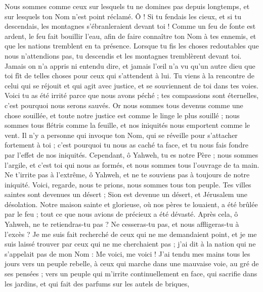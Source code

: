 \begin{multicols}{2}
Nous sommes comme ceux sur lesquels tu ne domines pas depuis longtemps, et sur lesquels ton Nom n'est point réclamé. Ô ! Si tu fendais les cieux, et si tu descendais, les montagnes s'ébranleraient devant toi !
\VerseOne{}Comme un feu de fonte est ardent, le feu fait bouillir l'eau, afin de faire connaître ton Nom à tes ennemis, et que les nations tremblent en ta présence.
Lorsque tu fis les choses redoutables que nous n'attendions pas, tu descendis et les montagnes tremblèrent devant toi.
Jamais on n'a appris ni entendu dire, et jamais l'œil n'a vu qu'un autre dieu que toi fît de telles choses pour ceux qui s'attendent à lui.
Tu viens à la rencontre de celui qui se réjouit et qui agit avec justice, et se souviennent de toi dans tes voies. Voici tu as été irrité parce que nous avons péché ; tes compassions sont éternelles, c'est pourquoi nous serons sauvés.
Or nous sommes tous devenus comme une chose souillée, et toute notre justice est comme le linge le plus souillé ; nous sommes tous flétris comme la feuille, et nos iniquités nous emportent comme le vent.
Il n'y a personne qui invoque ton Nom, qui se réveille pour s'attacher fortement à toi ; c'est pourquoi tu nous as caché ta face, et tu nous fais fondre par l'effet de nos iniquités.
Cependant, ô Yahweh, tu es notre Père ; nous sommes l'argile, et c'est toi qui nous as formés, et nous sommes tous l'ouvrage de ta main.
Ne t'irrite pas à l'extrême, ô Yahweh, et ne te souviens pas à toujours de notre iniquité. Voici, regarde, nous te prions, nous sommes tous ton peuple.
Tes villes saintes sont devenues un désert ; Sion est devenue un désert, et Jérusalem une désolation.
Notre maison sainte et glorieuse, où nos pères te louaient, a été brûlée par le feu ; tout ce que nous avions de précieux a été dévasté.
Après cela, ô Yahweh, ne te retiendras-tu pas ? Ne cesseras-tu pas, et nous affligeras-tu à l'excès ?
\VerseOne{}Je me suis fait recherché de ceux qui ne me demandaient point, et je me suis laissé trouver par ceux qui ne me cherchaient pas ; j'ai dit à la nation qui ne s'appelait pas de mon Nom : Me voici, me voici !
J'ai tendu mes mains tous les jours vers un peuple rebelle, à ceux qui marche dans une mauvaise voie, au gré de ses pensées ;
vers un peuple qui m'irrite continuellement en face, qui sacrifie dans les jardins, et qui fait des parfums sur les autels de briques,

\end{multicols}
